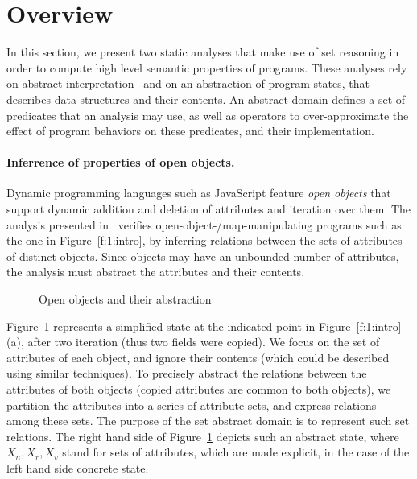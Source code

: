 \section{Overview}
\label{s:2:over}
In this section, we present two static analyses that make use of set
reasoning in order to compute high level semantic properties of
programs.
These analyses rely on abstract interpretation~\cite{cc:popl:77} and
on an abstraction of program states, that describes data structures
and their contents.
An abstract domain defines a set of predicates that an analysis may
use, as well as operators to over-approximate the effect of program
behaviors on these predicates, and their implementation.

\paragraph{Inferrence of properties of open objects.}
Dynamic programming languages such as JavaScript feature {\em open objects}
that support dynamic addition and deletion of attributes and iteration over
them.
The analysis presented in~\cite{hoo:14:sas} verifies
open-object-/map-manipulating programs such as the one
in Figure~\ref{f:1:intro}, by
inferring relations between the sets of attributes
of distinct objects.
Since objects may have an unbounded number of attributes, the analysis must 
abstract the attributes and their contents.
\newcommand{\varsrc}{\cvar{src}}
\newcommand{\vardst}{\cvar{dst}}
\begin{figure}[t]
  \newcommand{\picscale}{0.82}
  \centering
    \tikzpics{\picscale}{hoo-inv}
  \caption{Open objects and their abstraction}
  \label{f:2:hoo}
\end{figure}
Figure~\ref{f:2:hoo} represents a simplified state at the indicated
point in Figure~\ref{f:1:intro}(a),
after two iteration (thus two fields were copied).
We focus on the set of attributes of each object, and ignore their
contents (which could be described using similar techniques).
To precisely abstract the relations between the attributes of both objects
(\eg copied attributes are common to both objects), we partition the
attributes into a series of attribute sets,
and express relations among these sets.
The purpose of the set abstract domain is to represent such set
relations.
The right hand side of Figure~\ref{f:2:hoo} depicts such an abstract
state, where \( X_n, X_r, X_v \) stand for sets of attributes, which are
made explicit, in the case of the left hand side concrete state.

